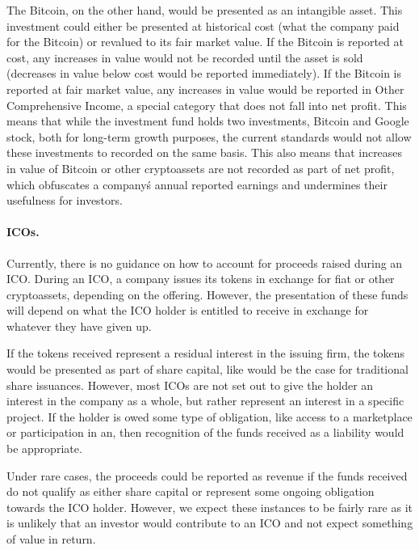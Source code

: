 The Bitcoin, on the other hand, would be presented as an intangible asset. This investment could either be presented at historical cost (what the company paid for the Bitcoin) or revalued to its fair market value. If the Bitcoin is reported at cost, any increases in value would not be recorded until the asset is sold (decreases in value below cost would be reported immediately). If the Bitcoin is reported at fair market value, any increases in value would be reported in Other Comprehensive Income, a special category that does not fall into net profit. This means that while the investment fund holds two investments, Bitcoin and Google stock, both for long-term growth purposes, the current standards would not allow these investments to recorded on the same basis. This also means that increases in value of Bitcoin or other cryptoassets are not recorded as part of net profit, which obfuscates a company\'s annual reported earnings and undermines their usefulness for investors. 



\paragraph{ICOs.} Currently, there is no guidance on how to account for proceeds raised during an ICO. During an ICO, a company issues its tokens in exchange for fiat or other cryptoassets, depending on the offering. However, the presentation of these funds will depend on what the ICO holder is entitled to receive in exchange for whatever they have given up.  

If the tokens received represent  a residual interest in the issuing firm, the tokens would be presented as part of share capital, like would be the case for traditional share issuances. However, most ICOs are not set out to give the holder an interest in the company as a whole, but rather represent an interest in a specific project. If the holder is owed some type of obligation, like access to a marketplace or participation in an, then recognition of the funds received as a liability would be appropriate. 

Under rare cases, the proceeds could be reported as revenue if the funds received do not qualify as either share capital or represent some ongoing obligation towards the ICO holder. However, we expect these instances to be fairly rare as it is unlikely that an investor would contribute to an ICO and not expect something of value in return. 



